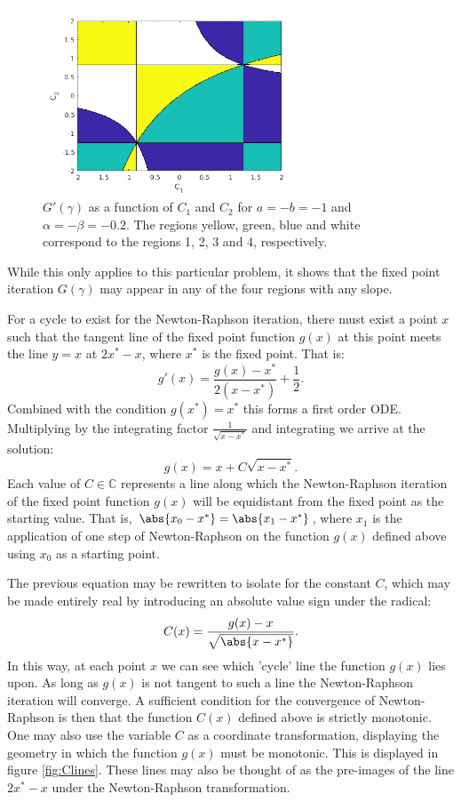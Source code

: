 \documentclass{book}
\begin{document}
\begin{figure}
\centering
\includegraphics[width=0.7\textwidth]{exp9_01.png}
\caption{$G'(\gamma)$ as a function of $C_1$ and $C_2$ for $a = -b = -1$ and $\alpha = -\beta = -0.2$.
The regions yellow, green, blue and white correspond to the regions 1, 2, 3 and 4, respectively.}
\end{figure}

While this only applies to this particular problem, it shows that the fixed point iteration $G(\gamma)$ may appear in any of the four regions with any slope.

For a cycle to exist for the Newton-Raphson iteration, there must exist a point $x$ such that the tangent line of the fixed point function $g(x)$ at this point meets the line $y=x$ at $2 x^* - x$, where $x^*$ is the fixed point.
That is:
\begin{equation*}
g'(x) = \frac{g(x)-x^*}{2 (x-x^*)} + \frac{1}{2} .
\end{equation*}
Combined with the condition $g(x^*) = x^*$ this forms a first order ODE.
Multiplying by the integrating factor $\frac{1}{\sqrt{x-x^*}}$ and integrating we arrive at the solution:
\begin{equation*}
g(x) = x + C \sqrt{x - x^*} .
\end{equation*}
Each value of $C \in \mathbb{C}$ represents a line along which the Newton-Raphson iteration of the fixed point function $g(x)$ will be equidistant from the fixed point as the starting value.
That is, $\abs{x_0 - x^*} = \abs{x_1 - x^*}$, where $x_1$ is the application of one step of Newton-Raphson on the function $g(x)$ defined above using $x_0$ as a starting point.

The previous equation may be rewritten to isolate for the constant $C$, which may be made entirely real by introducing an absolute value sign under the radical:
\begin{equation*}
C(x) = \frac{g(x) - x}{\sqrt{\abs{x-x^*}}} .
\end{equation*}
In this way, at each point $x$ we can see which 'cycle' line the function $g(x)$ lies upon.
As long as $g(x)$ is not tangent to such a line the Newton-Raphson iteration will converge.
A sufficient condition for the convergence of Newton-Raphson is then that the function $C(x)$ defined above is strictly monotonic.
One may also use the variable $C$ as a coordinate transformation, displaying the geometry in which the function $g(x)$ must be monotonic.
This is displayed in figure \ref{fig:Clines}.
These lines may also be thought of as the pre-images of the line $2 x^* - x$ under the Newton-Raphson transformation.
\end{document}
